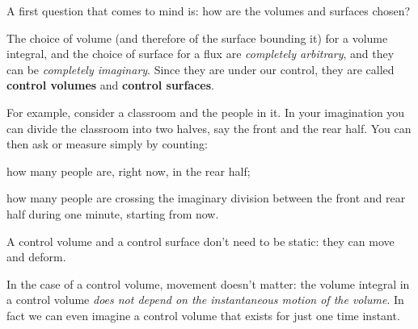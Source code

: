 \documentclass[a4paper,12pt,%
onecolumn,oneside,titlepage,%
british%
]{memoir}
\renewcommand*{\|}[1][]{\nonscript\:#1\vert\nonscript\:\mathopen{}}
\begin{document}
A first question that comes to mind is: how are the volumes and surfaces chosen?

The choice of volume (and therefore of the surface bounding it) for a volume integral, and the choice of surface for a flux are \emph{completely arbitrary}, and they can be \emph{completely imaginary}. Since they are under our control, they are called \textbf{control volumes} and \textbf{control surfaces}.

For example, consider a classroom and the people in it. In your imagination you can divide the classroom into two halves, say the front and the rear half. You can then ask or measure simply by counting:\enspace
\begin{enumerate*}[label=(\arabic*)]
\item how many people are, right now, in the rear half;\enspace
\item how many people are crossing the imaginary division between the front and rear half during one minute, starting from now.
\end{enumerate*}


\smallskip

A control volume and a control surface don't need to be static: they can move and deform.

In the case of a control volume, movement doesn't matter: the volume integral in a control volume \emph{does not depend on the instantaneous motion of the volume}. In fact we can even imagine a control volume that exists for just one time instant.
\end{document}
